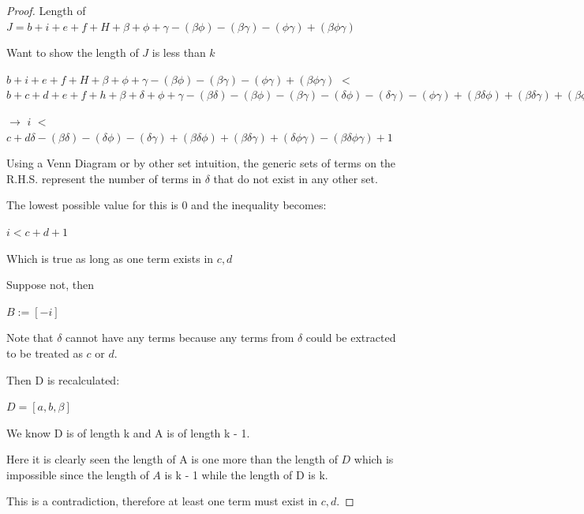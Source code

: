 \documentclass[manuscript]{acmart}
\begin{document}
\begin{proof}
        Length of $J = 
        b + i + e + f + H
        + \beta + \phi + \gamma
        - (\beta \phi) - (\beta \gamma) - (\phi \gamma)
        + (\beta \phi \gamma)
        $

        Want to show the length of $J$ is less than $k$

        $b + i + e + f + H
        + \beta + \phi + \gamma
        - (\beta \phi) - (\beta \gamma) - (\phi \gamma)
        + (\beta \phi \gamma)
        $
        $<$
        $b + c + d + e + f + h
        + \beta + \delta + \phi + \gamma
        - (\beta \delta) - (\beta \phi) - (\beta \gamma) - (\delta \phi) - (\delta \gamma) - (\phi \gamma)
        + (\beta \delta \phi) + (\beta \delta \gamma) + (\beta \phi \gamma) + (\delta \phi \gamma)
        - (\beta \delta \phi \gamma)
        + 1
        $

        $\rightarrow$
        $i
        $
        $<$
        $c + d
        \delta
        - (\beta \delta) - (\delta \phi) - (\delta \gamma)
        + (\beta \delta \phi) + (\beta \delta \gamma) + (\delta \phi \gamma)
        - (\beta \delta \phi \gamma)
        + 1
        $

        Using a Venn Diagram or by other set intuition, the generic sets
        of terms on the R.H.S. represent the number of terms in $\delta$
        that do not exist in any other set.

        The lowest possible value for this is 0 and the inequality becomes:

        $i < c + d + 1$

        Which is true as long as one term exists in {$c, d$}

        Suppose not, then 

        $B := [-i]$

        Note that $\delta$ cannot have any terms because any terms from
        $\delta$ could be extracted to be treated as $c$ or $d$.

        Then D is recalculated:

        $D = [a, b, \beta]$

        We know D is of length k and A is of length k - 1.

        Here it is clearly seen the length of A is one more
        than the length of $D$ which is impossible since the 
        length of $A$ is k - 1 while the length of D is k.

        This is a contradiction, therefore at least one term must exist
        in {$c, d$}.


\end{proof}
\end{document}
